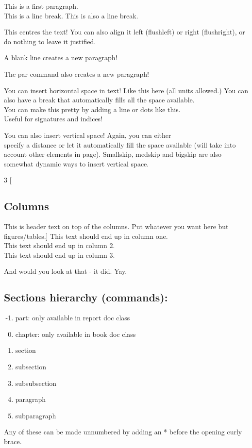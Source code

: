 \documentclass[12pt, letterpaper]{article} %
\begin{document}
This is a first paragraph.\\
This is a line break.\newline
This is also a line break. %

\begin{center}
	This centres the text! You can also align it left (flushleft) or right (flushright), or do nothing to leave it justified.
	
	A blank line creates a new paragraph!\par
	The par command also creates a new paragraph!
\end{center}

You can insert horizontal space in text! Like this \hspace{1cm} here (all units allowed.) You can also have a break that \hfill automatically fills all the space available. \\ You can make this pretty by adding a line \hrulefill or dots \dotfill like this. \\Useful for signatures and indices!

You can also insert vertical space! Again, you can either \vspace{5mm}\\specify a distance or let it automatically \vfill fill the space available (will take into account other elements in page). Smallskip, medskip and bigskip are also somewhat dynamic ways to insert vertical space.

\begin{multicols}{3} %
	[\subsection*{Columns}
	This is header text on top of the columns. Put whatever you want here but figures/tables.]
	This text should end up in column one. \\ This text should end up in column 2. \\ This text should end up in column 3.
\end{multicols}
And would you look at that - it did. Yay.


\clearpage
\subsection*{Sections hierarchy (commands):} %

\begin{enumerate}
	\setcounter{enumi}{-2} 
	\item part: only available in report doc class
	\item chapter: only available in book doc class
	\item section
	\item subsection
	\item subsubsection
	\item paragraph
	\item subparagraph
\end{enumerate}
Any of these can be made unnumbered by adding an * before the opening curly brace.
\end{document}
